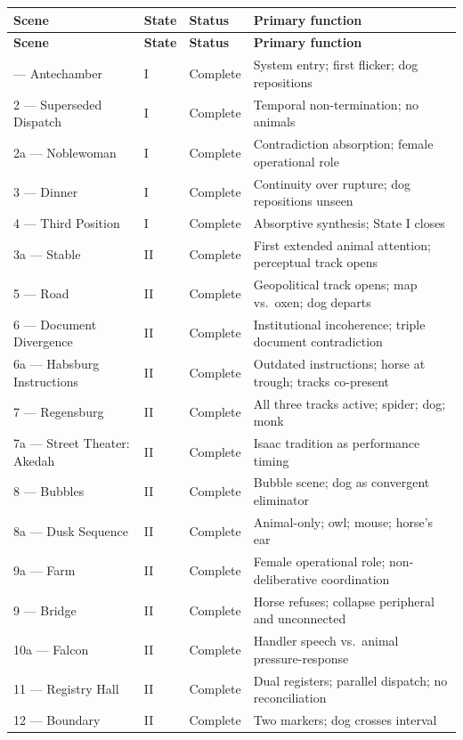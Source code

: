 \documentclass[12pt, oneside]{amsart}
\begin{document}
\begin{longtable}{p{3.2cm}p{1.5cm}p{1.5cm}p{5.8cm}}
\toprule
\textbf{Scene} & \textbf{State} & \textbf{Status} & \textbf{Primary function} \\
\midrule
\endfirsthead
\toprule
\textbf{Scene} & \textbf{State} & \textbf{Status} & \textbf{Primary function} \\
\midrule
\endhead
\bottomrule
\endfoot
1 — Antechamber & I & Complete & System entry; first flicker; dog repositions \\
2 — Superseded Dispatch & I & Complete & Temporal non-termination; no animals \\
2a — Noblewoman & I & Complete & Contradiction absorption; female operational role \\
3 — Dinner & I & Complete & Continuity over rupture; dog repositions unseen \\
4 — Third Position & I & Complete & Absorptive synthesis; State I closes \\
3a — Stable & II & Complete & First extended animal attention; perceptual track opens \\
5 — Road & II & Complete & Geopolitical track opens; map vs.\ oxen; dog departs \\
6 — Document Divergence & II & Complete & Institutional incoherence; triple document contradiction \\
6a — Habsburg Instructions & II & Complete & Outdated instructions; horse at trough; tracks co-present \\
7 — Regensburg & II & Complete & All three tracks active; spider; dog; monk \\
7a — Street Theater: Akedah & II & Complete & Isaac tradition as performance timing \\
8 — Bubbles & II & Complete & Bubble scene; dog as convergent eliminator \\
8a — Dusk Sequence & II & Complete & Animal-only; owl; mouse; horse's ear \\
9a — Farm & II & Complete & Female operational role; non-deliberative coordination \\
9 — Bridge & II & Complete & Horse refuses; collapse peripheral and unconnected \\
10a — Falcon & II & Complete & Handler speech vs.\ animal pressure-response \\
11 — Registry Hall & II & Complete & Dual registers; parallel dispatch; no reconciliation \\
12 — Boundary & II & Complete & Two markers; dog crosses interval \\

\end{longtable}
\end{document}
